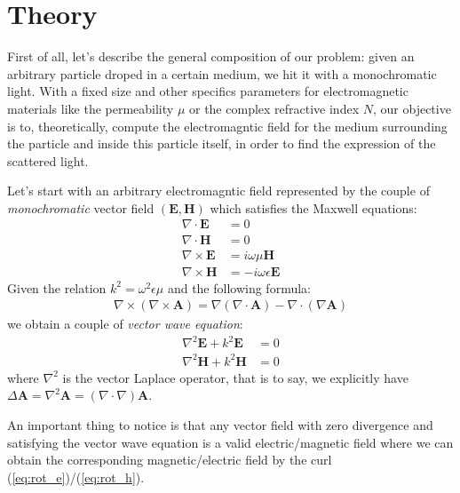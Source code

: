 \documentclass{article}
\begin{document}
\newpage

\section{Theory}

First of all, let's describe the general composition of our problem: given an arbitrary particle droped in a certain medium, we hit it with a monochromatic light. With a fixed size and other specifics parameters for electromagnetic materials like the permeability $\mu$ or the complex refractive index $N$, our objective is to, theoretically, compute the electromagntic field for the medium surrounding the particle and inside this particle itself, in order to find the expression of the scattered light.

Let's start with an arbitrary electromagntic field represented by the couple of \textit{monochromatic} vector field $(\textbf{E}, \textbf{H})$ which satisfies the Maxwell equations:
\begin{align}
\nabla \cdot \textbf{E} &= 0\\
\nabla \cdot \textbf{H} &= 0\\
\nabla \times \textbf{E} &= i\omega \mu \textbf{H} \label{eq:rot_e} \\
\nabla \times \textbf{H} &= -i\omega \epsilon \textbf{E} \label{eq:rot_h}
\end{align}
Given the relation $k^{2} = \omega ^{2}\epsilon \mu$ and the following formula:
\begin{align}\label{eq:rot_rot_a}
\nabla \times (\nabla \times \textbf{A}) = \nabla (\nabla \cdot \textbf{A}) - \nabla \cdot (\nabla \textbf{A})
\end{align}
we obtain a couple of \textit{vector wave equation}:
\begin{align}
\nabla ^{2} \textbf{E} + k^{2}\textbf{E}&=0\\
\nabla ^{2} \textbf{H} + k^{2}\textbf{H}&=0
\end{align}
where $\nabla ^{2}$ is the vector Laplace operator, that is to say, we explicitly have $\Delta \textbf{A} = \nabla ^{2} \textbf{A} = (\nabla \cdot \nabla) \textbf{A}$.

An important thing to notice is that any vector field with zero divergence and satisfying the vector wave equation is a valid electric/magnetic field where we can obtain the corresponding magnetic/electric field by the curl (\ref{eq:rot_e})/(\ref{eq:rot_h}).
\end{document}
